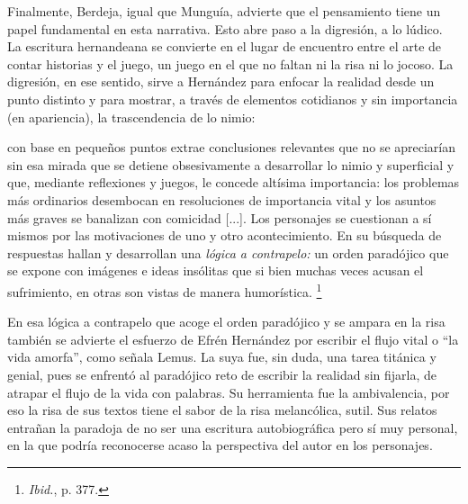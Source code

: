 \documentclass[14pt,twoside,final]{extbook} %
\let\oldfootnote\footnote
\renewcommand\footnote[1]{%
\oldfootnote{\hspace{1mm}#1}}
\begin{document}
Finalmente, Berdeja, igual que Munguía, advierte que el pensamiento tiene un papel fundamental en esta narrativa. Esto abre paso a la digresión, a lo lúdico. La escritura hernandeana se convierte en el lugar de encuentro entre el arte de contar historias y el juego, un juego en el que no faltan ni la risa ni lo jocoso. La digresión, en ese sentido, sirve a Hernández para enfocar la realidad desde un punto distinto y para mostrar, a través de elementos cotidianos y sin importancia (en apariencia), la trascendencia de lo nimio:
\begin{quoting}
con base en pequeños puntos extrae conclusiones relevantes que no se apreciarían sin esa mirada que se detiene obsesivamente a desarrollar lo nimio y superficial y que, mediante reflexiones y juegos, le concede altísima importancia: los problemas más ordinarios desembocan en resoluciones de importancia vital y los asuntos más graves se banalizan con comicidad [...]. Los personajes se cuestionan a sí mismos por las motivaciones de uno y otro acontecimiento. En su búsqueda de respuestas hallan y desarrollan una \emph{lógica a contrapelo:} un orden paradójico que se expone con imágenes e ideas insólitas que si bien muchas veces acusan el sufrimiento, en otras son vistas de manera humorística.\footnote{\emph{Ibid.}, p. 377.}
\end{quoting}
En esa lógica a contrapelo que acoge el orden paradójico y se ampara en la risa también se advierte el esfuerzo de Efrén Hernández por escribir el flujo vital o ``la vida amorfa'', como señala Lemus. La suya fue, sin duda, una tarea titánica y genial, pues se enfrentó al paradójico reto de escribir la realidad sin fijarla, de atrapar el flujo de la vida con palabras. Su herramienta fue la ambivalencia, por eso la risa de sus textos tiene el sabor de la risa melancólica, sutil. Sus relatos entrañan la paradoja de no ser una escritura autobiográfica pero sí muy personal, en la que podría reconocerse acaso la perspectiva del autor en los personajes.
\end{document}
